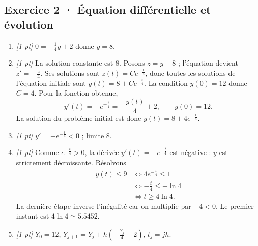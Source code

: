 \subsection*{Exercice 2 · Équation différentielle et évolution}\begin{enumerate}

\item \textit{[1 pt]} $0=-\frac{1}{4}y+2$ donne $y=8$.

\item \textit{[1 pt]} La solution constante est $8$. Posons $z=y-8$ ; l'équation devient $z'=-\frac{z}{4}$. Ses solutions sont $z(t)=Ce^{-\frac{t}{4}}$, donc toutes les solutions de l'équation initiale sont $y(t)=8+Ce^{-\frac{t}{4}}$.
La condition $y(0)=12$ donne $C=4$. Pour la fonction obtenue,
\[y'(t)=-e^{-\frac{t}{4}}=-\frac{y(t)}{4}+2,\qquad y(0)=12.\]
La solution du problème initial est donc $y(t)=8+4e^{-\frac{t}{4}}$.

\item \textit{[1 pt]} $y'=-e^{-\frac{t}{4}}<0$ ; limite $8$.

\item \textit{[1 pt]} Comme $e^{-\frac{t}{4}}>0$, la dérivée $y'(t)=-e^{-\frac{t}{4}}$ est négative : $y$ est strictement décroissante. Résolvons
\[\begin{aligned}y(t)\le 9&\Longleftrightarrow 4e^{-\frac{t}{4}}\le1\\&\Longleftrightarrow -\frac{t}{4}\le-\ln 4\\&\Longleftrightarrow t\ge 4\ln 4.\end{aligned}\]
La dernière étape inverse l'inégalité car on multiplie par $-4<0$. Le premier instant est $4\ln 4\simeq\num{5,5452}$.

\item \textit{[1 pt]} $Y_0=12$, $Y_{j+1}=Y_j+h(-\frac{Y_j}{4}+2)$, $t_j=jh$.

\end{enumerate}

